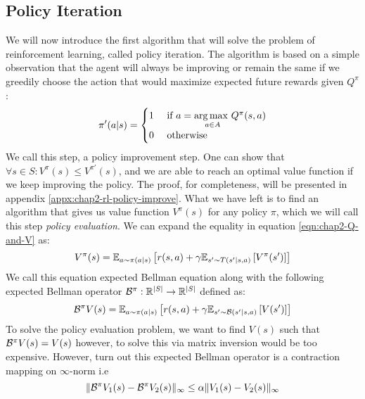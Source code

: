 \subsection{Policy Iteration}
\label{sec:chap2-policy-iter}
We will now introduce the first algorithm that will solve the problem of reinforcement learning, called policy iteration. The algorithm is based on a simple observation that the agent will always be improving or remain the same if we greedily choose the action that would maximize expected future rewards given $Q^\pi$:
\begin{equation}
    \label{eqn:chap2-greedy-Q}
    \pi'(a | s) = \begin{cases}
        1 &\text{ if } a = \underset{a \in A}{\arg\max \ } Q^\pi(s, a) \\
        0 &\text{ otherwise }
    \end{cases}
\end{equation}
We call this step, a policy improvement step. One can show that $\forall s \in S: V^\pi(s) \le V^{\pi'}(s)$, and we are able to reach an optimal value function if we keep improving the policy. The proof, for completeness, will be presented in appendix \ref{appx:chap2-rl-policy-improve}. What we have left is to find an algorithm that gives us value function $V^{\pi}(s)$ for any policy $\pi$, which we will call this step \textit{policy evaluation}. We can expand the equality in equation \ref{eqn:chap2-Q-and-V} as:
\begin{equation}
    V^\pi(s) = \mathbb{E}_{a \sim \pi(a | s)} \left[ r(s, a) + \gamma \mathbb{E}_{s' \sim T(s' | s, a)}\left[ V^\pi(s') \right] \right] 
\end{equation}
We call this equation expected Bellman equation along with the following expected Bellman operator $\mathcal{B}^{\pi} : \mathbb{R}^{|S|} \rightarrow \mathbb{R}^{|S|}$ defined as:
\begin{equation}
    \label{eqn:chap2-exp-bellman-operator}
    \mathcal{B}^{\pi} V(s) = \mathbb{E}_{a \sim \pi(a | s)} \left[ r(s, a) + \gamma \mathbb{E}_{s' \sim \mathcal{B}(s' | s, a)}\left[ V(s') \right] \right] 
\end{equation}
To solve the policy evaluation problem, we want to find $V(s)$ such that $\mathcal{B}^\pi V(s) = V(s)$ however, to solve this via matrix inversion would be too expensive. However, turn out this expected Bellman operator is a contraction mapping on $\infty$-norm i.e 
\begin{equation*}
    \| \mathcal{B}^\pi V_1(s) - \mathcal{B}^\pi V_2(s) \|_\infty \le \alpha \|V_1(s) - V_2(s)\|_\infty
\end{equation*}
